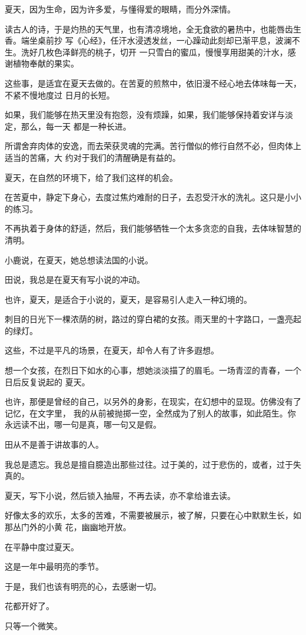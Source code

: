 		夏天，因为生命，因为许多爱，与懂得爱的眼睛，而分外深情。

		读古人的诗，于是灼热的天气里，也有清凉境地，全无食欲的暑热中，也能唇齿生香。端坐桌前抄
	写《心经》，任汗水浸透发丝，一心躁动此刻却已渐平息，波澜不生。洗好几枚色泽鲜亮的桃子，切开
	一只雪白的蜜瓜，慢慢享用甜美的汁水，感谢植物奉献的果实。

		这些事，是适宜在夏天去做的。在苦夏的煎熬中，依旧漫不经心地去体味每一天，不紧不慢地度过
	日月的长短。

		如果，我们能够在热天里没有抱怨，没有烦躁，如果，我们能够保持着安详与淡定，那么，每一天
	都是一种长进。

		所谓舍弃肉体的安逸，而去荣获灵魂的完满。苦行僧似的修行自然不必，但肉体上适当的苦痛，大
	约对于我们的清醒确是有益的。

		夏天，在自然的环境下，给了我们这样的机会。

		在苦夏中，静定下身心，去度过焦灼难耐的日子，去忍受汗水的洗礼。这只是小小的练习。\par
		不再执着于身体的舒适，然后，我们能够牺牲一个太多贪恋的自我，去体味智慧的清明。

		小鹿说，在夏天，她总想读法国的小说。\par
		田说，我总是在夏天有写小说的冲动。\par
		也许，夏天，是适合于小说的，夏天，是容易引人走入一种幻境的。\par
		刺目的日光下一棵浓荫的树，路过的穿白裙的女孩。雨天里的十字路口，一盏亮起的绿灯。\par
		这些，不过是平凡的场景，在夏天，却令人有了许多遐想。

		想一个女孩，在烈日下如水的心事，想她淡淡描了的眉毛。一场青涩的青春，一个日后反复说起的
	夏天。

		也许，那便是曾经的自己，以另外的身影，在现实，在幻想中的显现。仿佛没有了记忆，在文字里，
	我的从前被抛掷一空，全然成为了别人的故事，如此陌生。你永远读不出，哪一句是真，哪一句又是假。

		田从不是善于讲故事的人。\par
		我总是遗忘。我总是擅自臆造出那些过往。过于美的，过于悲伤的，或者，过于失真的。

		夏天，写下小说，然后锁入抽屉，不再去读，亦不拿给谁去读。

		好像太多的欢乐，太多的苦难，不需要被展示，被了解，只要在心中默默生长，如那丛门外的小黄
	花，幽幽地开放。

		在平静中度过夏天。\par
		这是一年中最明亮的季节。\par
		于是，我们也该有明亮的心，去感谢一切。\par
		花都开好了。\par
		只等一个微笑。

